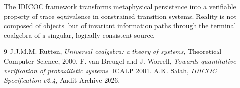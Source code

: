\documentclass[11pt,a4paper]{article}
\begin{document}
The IDICOC framework transforms metaphysical persistence into a verifiable property of trace equivalence in constrained transition systems. Reality is not composed of objects, but of invariant information paths through the terminal coalgebra of a singular, logically consistent source.

\begin{thebibliography}{9}
 J.J.M.M. Rutten, \emph{Universal coalgebra: a theory of systems}, Theoretical Computer Science, 2000.
 F. van Breugel and J. Worrell, \emph{Towards quantitative verification of probabilistic systems}, ICALP 2001.
 A.K. Salah, \emph{IDICOC Specification v2.4}, Audit Archive 2026.
\end{thebibliography}
\end{document}
